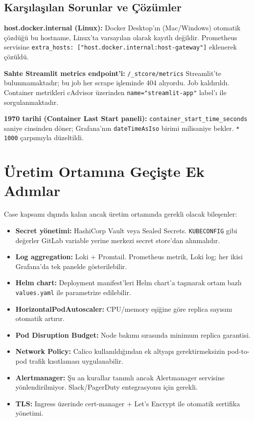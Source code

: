 \documentclass[12pt,a4paper]{article}
\begin{document}
\subsection{Karşılaşılan Sorunlar ve Çözümler}

\textbf{host.docker.internal (Linux):}
Docker Desktop'ın (Mac/Windows) otomatik çözdüğü bu hostname, Linux'ta
varsayılan olarak kayıtlı değildir. Prometheus servisine
\texttt{extra\_hosts: ["host.docker.internal:host-gateway"]} eklenerek
çözüldü.

\textbf{Sahte Streamlit metrics endpoint'i:}
\texttt{/\_stcore/metrics} Streamlit'te bulunmamaktadır; bu job her
scrape işleminde 404 alıyordu. Job kaldırıldı. Container metrikleri
cAdvisor üzerinden \texttt{name="streamlit-app"} label'ı ile
sorgulanmaktadır.

\textbf{1970 tarihi (Container Last Start paneli):}
\texttt{container\_start\_time\_seconds} saniye cinsinden döner;
Grafana'nın \texttt{dateTimeAsIso} birimi milisaniye bekler.
\texttt{* 1000} çarpımıyla düzeltildi.

\section{Üretim Ortamına Geçişte Ek Adımlar}

Case kapsamı dışında kalan ancak üretim ortamında gerekli olacak
bileşenler:

\begin{itemize}[leftmargin=*]
  \item \textbf{Secret yönetimi:} HashiCorp Vault veya Sealed Secrets.
        \texttt{KUBECONFIG} gibi değerler GitLab variable yerine
        merkezi secret store'dan alınmalıdır.
  \item \textbf{Log aggregation:} Loki + Promtail. Prometheus metrik,
        Loki log; her ikisi Grafana'da tek panelde gösterilebilir.
  \item \textbf{Helm chart:} Deployment manifest'leri Helm chart'a
        taşınarak ortam bazlı \texttt{values.yaml} ile parametrize
        edilebilir.
  \item \textbf{HorizontalPodAutoscaler:} CPU/memory eşiğine göre
        replica sayısını otomatik artırır.
  \item \textbf{Pod Disruption Budget:} Node bakımı sırasında minimum
        replica garantisi.
  \item \textbf{Network Policy:} Calico kullanıldığından ek altyapı
        gerektirmeksizin pod-to-pod trafik kısıtlaması uygulanabilir.
  \item \textbf{Alertmanager:} Şu an kurallar tanımlı ancak
        Alertmanager servisine yönlendirilmiyor. Slack/PagerDuty
        entegrasyonu için gerekli.
  \item \textbf{TLS:} Ingress üzerinde cert-manager + Let's Encrypt
        ile otomatik sertifika yönetimi.
\end{itemize}
\end{document}
